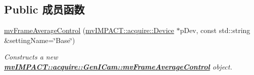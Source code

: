 \subsection*{Public 成员函数}
\begin{DoxyCompactItemize}
\item 
\hyperlink{classmv_i_m_p_a_c_t_1_1acquire_1_1_gen_i_cam_1_1mv_frame_average_control_a00ee9c866bcbeca61561b7fe26f9c9db}{mv\+Frame\+Average\+Control} (\hyperlink{classmv_i_m_p_a_c_t_1_1acquire_1_1_device}{mv\+I\+M\+P\+A\+C\+T\+::acquire\+::\+Device} $\ast$p\+Dev, const std\+::string \&setting\+Name=\char`\"{}Base\char`\"{})
\begin{DoxyCompactList}\small\item\em Constructs a new {\bfseries \hyperlink{classmv_i_m_p_a_c_t_1_1acquire_1_1_gen_i_cam_1_1mv_frame_average_control}{mv\+I\+M\+P\+A\+C\+T\+::acquire\+::\+Gen\+I\+Cam\+::mv\+Frame\+Average\+Control}} object. \end{DoxyCompactList}\end{DoxyCompactItemize}
